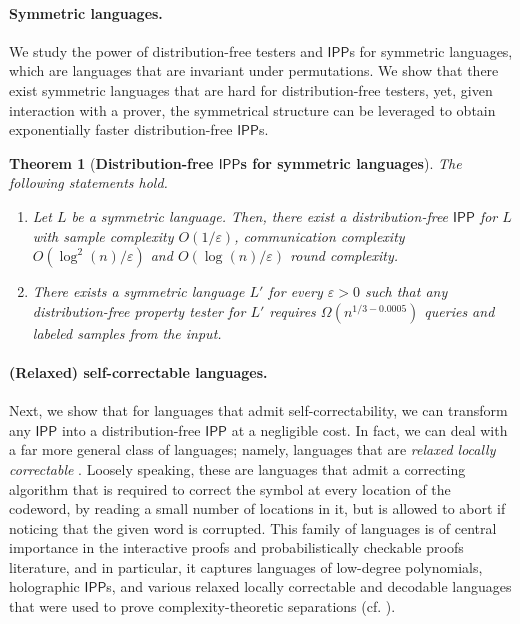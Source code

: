 \documentclass[11pt]{article}
\newtheorem{theorem}{Theorem}[section]
\newcommand{\IPP}{\mathsf{IPP}}
\begin{document}
\paragraph{Symmetric languages.}
We study the power of distribution-free testers and $\IPP$s for symmetric languages, which are languages that are invariant under permutations. We show that there exist symmetric languages that are hard for distribution-free testers, yet, given interaction with a prover, the symmetrical structure can be leveraged to obtain exponentially faster distribution-free $\IPP$s.

\begin{theorem}[\textbf{Distribution-free $\IPP$s for symmetric languages}]
    \label{thm:informal_ham_sep}
The following statements hold.
\begin{enumerate}
    \item Let $L$ be a symmetric language. Then, there exist a distribution-free $\IPP$ for $L$ with sample complexity $O(1/\varepsilon)$, communication complexity $O(\log^{2}(n)/\varepsilon)$ and $O(\log(n)/\varepsilon)$ round complexity.
    \item There exists a symmetric language $L'$ for every $\varepsilon>0$ such that any distribution-free property tester for $L'$ requires $\Omega(n^{1/3-0.0005})$ queries and labeled samples from the input.
\end{enumerate}

\end{theorem}

\paragraph{(Relaxed) self-correctable languages.}
Next, we show that for languages that admit self-correctability, we can transform any $\IPP$ into a distribution-free $\IPP$ at a negligible cost. In fact, we can deal with a far more general class of languages; namely, languages that are \emph{relaxed locally correctable} \cite{BGHSV04,GRR20_rlcc}. Loosely speaking, these are languages that admit a correcting algorithm that is required to correct the symbol at every location of the codeword, by reading a small number of locations in it, but is allowed to abort if noticing that the given word is corrupted. This family of languages is of central importance in the interactive proofs and probabilistically checkable proofs literature, and in particular, it captures languages of low-degree polynomials, holographic $\IPP$s, and various relaxed locally correctable and decodable languages that were used to prove complexity-theoretic separations (cf. \cite{gur2017locally}).
\end{document}

